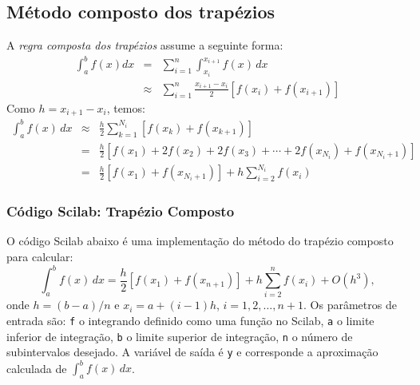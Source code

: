 \subsection{Método composto dos trapézios}
A \emph{regra composta dos trapézios} assume a seguinte forma:
\begin{eqnarray*}
  \int_{a}^b f(x)dx &=& \sum_{i=1}^{n} \int_{x_i}^{x_{i+1}}f(x)\,dx \\
  &\approx& \sum_{i=1}^{n} \frac{x_{i+1}-x_i}{2}\left[f(x_i)+f(x_{i+1})\right]
\end{eqnarray*}
Como $h = x_{i+1} - x_i$, temos:
\begin{eqnarray*}
\int_{a}^b f(x)\,dx &\approx& \frac{h}{2}\sum_{k=1}^{N_i}\left[f(x_k)+f(x_{k+1})\right]\\
&=& \frac{h}{2}\left[f(x_1)+2f(x_2)+2f(x_3)+\cdots + 2f(x_{N_i})+f(x_{N_i+1})\right]\\
&=& \frac{h}{2}\left[f(x_1) + f(x_{N_i+1})\right] + h\sum_{i=2}^{N_i} f(x_i)
\end{eqnarray*}

\ifisscilab
\subsubsection{Código Scilab: Trapézio Composto}
O código Scilab abaixo é uma implementação do método do trapézio composto para calcular:
\begin{equation*}
  \int_a^b f(x)\,dx = \frac{h}{2}\left[f(x_1) + f(x_{n+1})\right] + h\sum_{i=2}^n f(x_i) + O(h^3),
\end{equation*}
onde $h = (b-a)/n$ e $x_i = a + (i-1)h$, $i=1,2,\dotsc,n+1$. Os parâmetros de entrada são: \verb+f+ o integrando definido como uma função no Scilab, \verb+a+ o limite inferior de integração, \verb+b+ o limite superior de integração, \verb+n+ o número de subintervalos desejado. A variável de saída é \verb+y+ e corresponde a aproximação calculada de $\int_a^b f(x)\, dx$.


\fi

